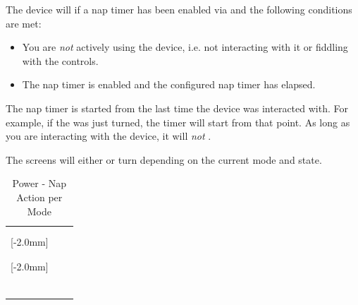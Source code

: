 The device will  if a nap timer has been enabled via
\hyperref[Power Settings]{} and the following conditions are met:

\begin{itemize}
  \item You are \textit{not} actively using the device, i.e. not interacting
    with it or fiddling with the controls.
  \item The nap timer is enabled and the configured nap timer has elapsed.
\end{itemize}

The nap timer is started from the last time the device was interacted with. For
example, if the  was just turned, the timer will start from that point.
As long as you are interacting with the device, it will \textit{not} .

\par\medskip

The screens will either  or turn  depending on the current mode
and state.

\begin{table}[H]
  \begin{tabu} { X[1,c,m] | X[1,c,m] | X[1,c,m] }
  \thrule
   &  &  \\ \mrule

  \hyperref[Clock]{} &  &  \\ \mrule

  [-2.0mm]{\hyperref[Timer]{}}
    &  &  \\
    &  & \\ 
    &  &  \\ \mrule

  [-2.0mm]{\hyperref[Touch Settings]{}}
    &  &  \\
    &  & \\
    &  & \\
    &  & \\ 
    &  &  \\ \mrule

   &  &  \\

  \bhrule
  \end{tabu}
\caption{Power - Nap Action per Mode}
\end{table}

